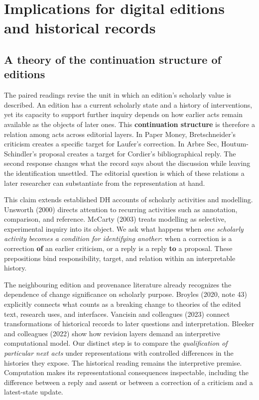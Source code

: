 \documentclass[11pt,a4paper]{article}
\begin{document}
\section{Implications for digital editions and historical records}

\subsection{A theory of the continuation structure of editions}

The paired readings revise the unit in which an edition's scholarly value is described. An edition has a current scholarly state and a history of interventions, yet its capacity to support further inquiry depends on how earlier acts remain available as the objects of later ones. This \textbf{continuation structure} is therefore a relation among acts across editorial layers. In Paper Money, Bretschneider's criticism creates a specific target for Laufer's correction. In Arbre Sec, Houtum-Schindler's proposal creates a target for Cordier's bibliographical reply. The second response changes what the record says about the discussion while leaving the identification unsettled. The editorial question is which of these relations a later researcher can substantiate from the representation at hand.


This claim extends established DH accounts of scholarly activities and modelling. Unsworth (2000) directs attention to recurring activities such as annotation, comparison, and reference. McCarty (2003) treats modelling as selective, experimental inquiry into its object. We ask what happens when \emph{one scholarly activity becomes a condition for identifying another}: when a correction is a correction \textbf{of} an earlier criticism, or a reply is a reply \textbf{to} a proposal. These prepositions bind responsibility, target, and relation within an interpretable history.


The neighbouring edition and provenance literature already recognizes the dependence of change significance on scholarly purpose. Broyles (2020, note 43) explicitly connects what counts as a breaking change to theories of the edited text, research uses, and interfaces. Vancisin and colleagues (2023) connect transformations of historical records to later questions and interpretation. Bleeker and colleagues (2022) show how revision layers demand an interpretive computational model. Our distinct step is to compare the \emph{qualification of particular next acts} under representations with controlled differences in the histories they expose. The historical reading remains the interpretive premise. Computation makes its representational consequences inspectable, including the difference between a reply and assent or between a correction of a criticism and a latest-state update.
\end{document}

